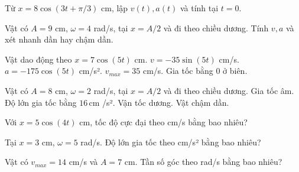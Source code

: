 \begin{ex}
Từ $x=8\cos(3t+\pi/3)$ cm, lập $v(t),a(t)$ và tính tại $t=0$.
\choiceTF

\end{ex}

\begin{ex}
Vật có $A=9$ cm, $\omega=4$ rad/s, tại $x=A/2$ và đi theo chiều dương. Tính $v,a$ và xét nhanh dần hay chậm dần.
\choiceTF

\end{ex}

\begin{ex}
Vật dao động theo $x=7\cos(5t)$ cm.
\choiceTF
{\True $v=-35\sin(5t)$ cm/s.}
{\True $a=-175\cos(5t)$ cm/s².}
{\True $v_{max}=35$ cm/s.}
{Gia tốc bằng 0 ở biên.}
\end{ex}

\begin{ex}
Vật có $A=8$ cm, $\omega=2$ rad/s, tại $x=A/2$ và đi theo chiều dương.
\choiceTF
{\True Gia tốc âm.}
{\True Độ lớn gia tốc bằng $16\,\text{cm}$ /s².}
{\True Vận tốc dương.}
{\True Vật chậm dần.}
\end{ex}

\begin{ex}
Với $x=5\cos(4t)$ cm, tốc độ cực đại theo cm/s bằng bao nhiêu?
\end{ex}

\begin{ex}
Tại $x=3$ cm, $\omega=5$ rad/s. Độ lớn gia tốc theo cm/s² bằng bao nhiêu?
\end{ex}

\begin{ex}
Vật có $v_{max}=14$ cm/s và $A=7$ cm. Tần số góc theo rad/s bằng bao nhiêu?
\end{ex}

